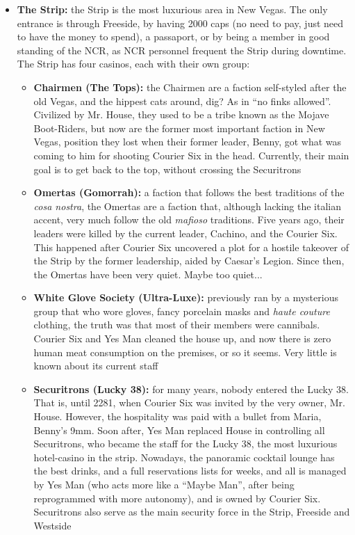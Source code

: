 \begin{itemize}
\item \textbf{The Strip:} the Strip is the most luxurious area in New Vegas. The only entrance is through Freeside, by having 2000 caps (no need to pay, just need to have the money to spend), a passaport, or by being a member in good standing of the NCR, as NCR personnel frequent the Strip during downtime. The Strip has four casinos, each with their own group:
	\begin{itemize}
	\item \textbf{Chairmen (The Tops):} the Chairmen are a faction self-styled after the old Vegas, and the hippest cats around, dig? As in ``no finks allowed''. Civilized by Mr. House, they used to be a tribe known as the Mojave Boot-Riders, but now are the former most important faction in New Vegas, position they lost when their former leader, Benny, got what was coming to him for shooting Courier Six in the head. Currently, their main goal is to get back to the top, without crossing the Securitrons
	\item \textbf{Omertas (Gomorrah):} a faction that follows the best traditions of the \textit{cosa nostra}, the Omertas are a faction that, although lacking the italian accent, very much follow the old \textit{mafioso} traditions. Five years ago, their leaders were killed by the current leader, Cachino, and the Courier Six. This happened after Courier Six uncovered a plot for a hostile takeover of the Strip by the former leadership, aided by Caesar's Legion. Since then, the Omertas have been very quiet. Maybe too quiet...
	\item \textbf{White Glove Society (Ultra-Luxe):} previously ran by a mysterious group that who wore gloves, fancy porcelain masks and \textit{haute couture} clothing, the truth was that most of their members were cannibals. Courier Six and Yes Man cleaned the house up, and now there is zero human meat consumption on the premises, or so it seems. Very little is known about its current staff
	\item \textbf{Securitrons (Lucky 38):} for many years, nobody entered the Lucky 38. That is, until 2281, when Courier Six was invited by the very owner, Mr. House. However, the hospitality was paid with a bullet from Maria, Benny's 9mm. Soon after, Yes Man replaced House in controlling all Securitrons, who became the staff for the Lucky 38, the most luxurious hotel-casino in the strip. Nowadays, the panoramic cocktail lounge has the best drinks, and a full reservations lists for weeks, and all is managed by Yes Man (who acts more like a ``Maybe Man'', after being reprogrammed with more autonomy), and is owned by Courier Six. Securitrons also serve as the main security force in the Strip, Freeside and Westside
	\end{itemize} 


\end{itemize}
